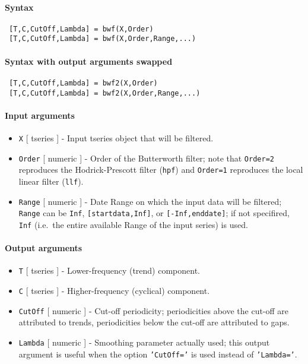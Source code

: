 


	\paragraph{Syntax}
 
 \begin{verbatim}
 [T,C,CutOff,Lambda] = bwf(X,Order)
 [T,C,CutOff,Lambda] = bwf(X,Order,Range,...)
 \end{verbatim}
 
 \paragraph{Syntax with output arguments swapped}
 
 \begin{verbatim}
 [T,C,CutOff,Lambda] = bwf2(X,Order)
 [T,C,CutOff,Lambda] = bwf2(X,Order,Range,...)
 \end{verbatim}
 
 \paragraph{Input arguments}
 
 \begin{itemize}
 \item
   \texttt{X} {[} tseries {]} - Input tseries object that will be
   filtered.
 \item
   \texttt{Order} {[} numeric {]} - Order of the Butterworth filter; note
   that \texttt{Order=2} reproduces the Hodrick-Prescott filter
   (\texttt{hpf}) and \texttt{Order=1} reproduces the local linear filter
   (\texttt{llf}).
 \item
   \texttt{Range} {[} numeric {]} - Date Range on which the input data
   will be filtered; \texttt{Range} can be \texttt{Inf},
   \texttt{{[}startdata,Inf{]}}, or \texttt{{[}-Inf,enddate{]}}; if not
   specifired, \texttt{Inf} (i.e.~the entire available Range of the input
   series) is used.
 \end{itemize}
 
 \paragraph{Output arguments}
 
 \begin{itemize}
 \item
   \texttt{T} {[} tseries {]} - Lower-frequency (trend) component.
 \item
   \texttt{C} {[} tseries {]} - Higher-frequency (cyclical) component.
 \item
   \texttt{CutOff} {[} numeric {]} - Cut-off periodicity; periodicities
   above the cut-off are attributed to trends, periodicities below the
   cut-off are attributed to gaps.
 \item
   \texttt{Lambda} {[} numeric {]} - Smoothing parameter actually used;
   this output argument is useful when the option \texttt{'CutOff='} is
   used instead of \texttt{'Lambda='}.
 \end{itemize}
 
